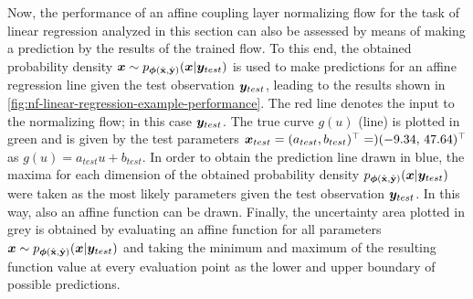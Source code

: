 \documentclass[a4paper,12pt]{report}
\begin{document}
Now, the performance of an affine coupling layer normalizing flow for the task of linear regression analyzed in this section can also be assessed by means of making a prediction by the results of the trained flow. To this end, the obtained probability density $\bm{x} \sim p_{\bm{\phi}(\hat{\boldsymbol{\mathbf{x}}},\hat{\boldsymbol{\mathbf{y}}})}(\bm{x}|\bm{y}_{test})$ is used to make predictions for an affine regression line given the test observation $\bm{y}_{test}$, leading to the results shown in \cref{fig:nf-linear-regression-example-performance}. The red line denotes the input to the normalizing flow; in this case $\bm{y}_{test}$. The true curve $g(u)$ (line) is plotted in green and is given by the test parameters $\bm{x}_{test} = (a_{test}, b_{test})^\top = )(-9.34,\,47.64)^\top$ as $g(u) = a_{test}u + b_{test}$. In order to obtain the prediction line drawn in blue, the maxima for each dimension of the obtained probability density $p_{\bm{\phi}(\hat{\boldsymbol{\mathbf{x}}},\hat{\boldsymbol{\mathbf{y}}})}(\bm{x}|\bm{y}_{test})$ were taken as the most likely parameters given the test observation $\bm{y}_{test}$. In this way, also an affine function can be drawn. Finally, the uncertainty area plotted in grey is obtained by evaluating an affine function for all parameters $\bm{x} \sim p_{\bm{\phi}(\hat{\boldsymbol{\mathbf{x}}},\hat{\boldsymbol{\mathbf{y}}})}(\bm{x}|\bm{y}_{test})$ and taking the minimum and maximum of the resulting function value at every evaluation point as the lower and upper boundary of possible predictions.
\end{document}
